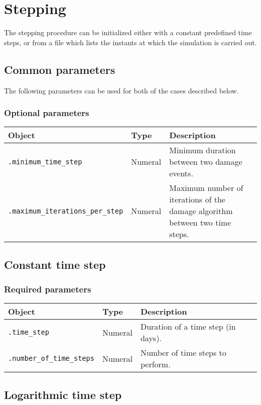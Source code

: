 \documentclass[10pt]{article}
\begin{document}
\section{Stepping}

The stepping procedure can be initialized either with a constant predefined time steps, or from a file which lists the instants at which the simulation is carried out.

\subsection{Common parameters}

The following parameters can be used for both of the cases described below.

\subsubsection*{Optional parameters}

\begin{tabularx}{\textwidth}{llX}
\hline 
Object & Type & Description \\ 
\hline 
\verb+.minimum_time_step+ & Numeral & Minimum duration between two damage events. \\ 
\verb+.maximum_iterations_per_step+ & Numeral & Maximum number of iterations of the damage algorithm between two time steps.\\
\hline 
\end{tabularx}

\subsection{Constant time step}

\subsubsection*{Required parameters}

\begin{tabularx}{\textwidth}{llX}
\hline 
Object & Type & Description \\ 
\hline 
\verb+.time_step+ & Numeral & Duration of a time step (in days). \\ 
\verb+.number_of_time_steps+ & Numeral & Number of time steps to perform.\\
\hline 
\end{tabularx}

\subsection{Logarithmic time step}
\end{document}
